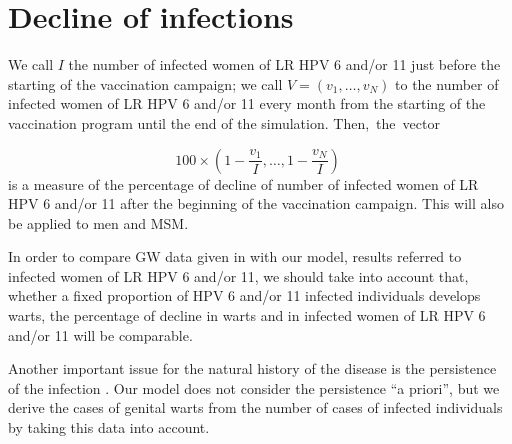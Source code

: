 \section{Decline of infections}

We call $I$ the number of infected women of LR HPV 6 and/or 11 just before the starting of the vaccination campaign; we call $V = ( v_1, \ldots, v_N)$ to the number of infected women of LR HPV 6 and/or 11 every month from the starting of the vaccination program until the end of the simulation. Then,~the~vector 

\begin{equation}
100 \times \left( 1-\displaystyle\frac{v_1}{I}, \ldots, 1-\displaystyle\frac{v_N}{I} \right) \; 
\end{equation}
is a measure of the percentage of decline of number of infected women of LR HPV 6 and/or 11 after the beginning of the vaccination campaign. This will also be applied to men and MSM.

In order to compare GW data given in \cite{ali2013genital} with our model, results referred to infected women of LR HPV 6 and/or 11, we should take into account that, whether a fixed proportion of HPV 6 and/or 11 infected individuals develops warts, the percentage of decline in warts and in infected women of LR HPV 6 and/or 11 will be comparable. 

Another important issue for the natural history of the disease is the persistence of the infection \cite{campos2014updated}. Our model does not consider the persistence ``a priori'', but we derive the cases of genital warts from the number of cases of infected individuals by taking this data into account.
